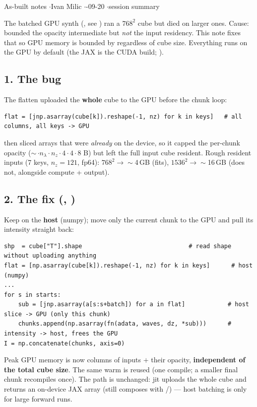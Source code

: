 


%
{As-built notes \quad$\cdot$\quad Ivan Milic \quad$\cdot$-09-20 \quad$\cdot$\quad session summary}

The batched GPU synth (, see )
ran a $768^2$ cube but died on larger ones. Cause:  bounded the opacity intermediate but
\emph{not} the input residency. This note fixes that so GPU memory is bounded by  regardless
of cube size. Everything runs on the GPU by default (the  JAX is the CUDA build;
).

\subsection*{1. The bug}
The flatten uploaded the \textbf{whole} cube to the GPU before the chunk loop:
{\small\begin{verbatim}
flat = [jnp.asarray(cube[k]).reshape(-1, nz) for k in keys]   # all columns, all keys -> GPU
\end{verbatim}}
 then sliced arrays that were \emph{already} on the device, so it capped the per-chunk
opacity ($\sim$\,$\cdot n_\lambda\cdot n_z\cdot4\cdot4\cdot8$ B) but left the full input cube
resident. Rough resident inputs (7 keys, $n_z{=}121$, fp64): $768^2\!\to\!\sim$4\,GB (fits),
$1536^2\!\to\!\sim$16\,GB (does not, alongside compute + output).

\subsection*{2. The fix (, )}
Keep  on the \textbf{host} (numpy); move only the current chunk to the GPU and pull its
intensity straight back:
{\small\begin{verbatim}
shp  = cube["T"].shape                              # read shape without uploading anything
flat = [np.asarray(cube[k]).reshape(-1, nz) for k in keys]      # host (numpy)
...
for s in starts:
    sub = [jnp.asarray(a[s:s+batch]) for a in flat]            # host slice -> GPU (only this chunk)
    chunks.append(np.asarray(fn(adata, waves, dz, *sub)))      # intensity -> host, frees the GPU
I = np.concatenate(chunks, axis=0)
\end{verbatim}}
Peak GPU memory is now  columns of inputs $+$ their opacity, \textbf{independent of the total
cube size}. The same warm  is reused (one compile; a smaller final chunk recompiles once).
The  path is unchanged: jit uploads the whole cube and returns an on-device JAX array
(still composes with /) --- host batching is only for large forward runs.

